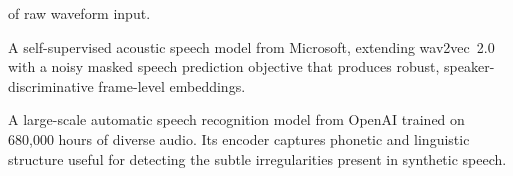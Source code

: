 \documentclass[11pt,a4paper]{article}
\begin{document}
\begin{description}[style=nextline, leftmargin=3.5cm, labelwidth=3.3cm,
                    font=\normalfont\bfseries]
    of raw waveform input.
  \item[WavLM] A self-supervised acoustic speech model from Microsoft, extending
    wav2vec~2.0 with a noisy masked speech prediction objective that produces
    robust, speaker-discriminative frame-level embeddings.
  \item[Whisper] A large-scale automatic speech recognition model from OpenAI
    trained on 680,000 hours of diverse audio. Its encoder captures phonetic and
    linguistic structure useful for detecting the subtle irregularities present in
    synthetic speech.
\end{description}
\end{document}
